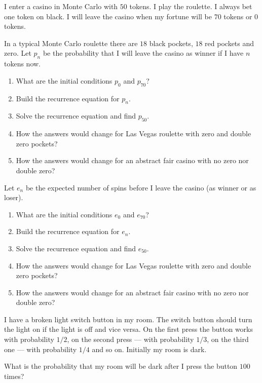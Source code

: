 \documentclass[12pt]{article}
\begin{document}
\begin{exercise}
I enter a casino in Monte Carlo with $50$ tokens. I play the roulette.
I always bet one token on black. I will leave the casino when my fortune will be $70$ tokens or $0$ tokens. 

In a typical Monte Carlo roulette there are $18$ black pockets, $18$ red pockets and zero. 
Let $p_n$ be the probability that I will leave the casino as winner if I have $n$ tokens now. 
\begin{enumerate}[label=\alph*)]
    \item What are the initial conditions $p_0$ and $p_{70}$?
    \item Build the recurrence equation for $p_n$. 
    \item Solve the recurrence equation and find $p_{50}$.
    \item How the answers would change for Las Vegas roulette with zero and double zero pockets?
    \item How the answers would change for an abstract fair casino with no zero nor double zero?
\end{enumerate}
Let $e_n$ be the expected number of spins before I leave the casino (as winner or as loser).
\begin{enumerate}[resume]
    \item What are the initial conditions $e_0$ and $e_{70}$?
    \item Build the recurrence equation for $e_n$. 
    \item Solve the recurrence equation and find $e_{50}$.
    \item How the answers would change for Las Vegas roulette with zero and double zero pockets?
    \item How the answers would change for an abstract fair casino with no zero nor double zero?
\end{enumerate}

    


\end{exercise}


\begin{exercise}
I have a broken light switch button in my room. 
The switch button should turn the light on if the light is off and vice versa.
On the first press the button works with probability $1/2$, on the second press — with probability $1/3$, on the third one — with probability $1/4$ and so on.
Initially my room is dark.

What is the probability that my room will be dark after I press the button $100$ times?
\end{exercise}
\end{document}
